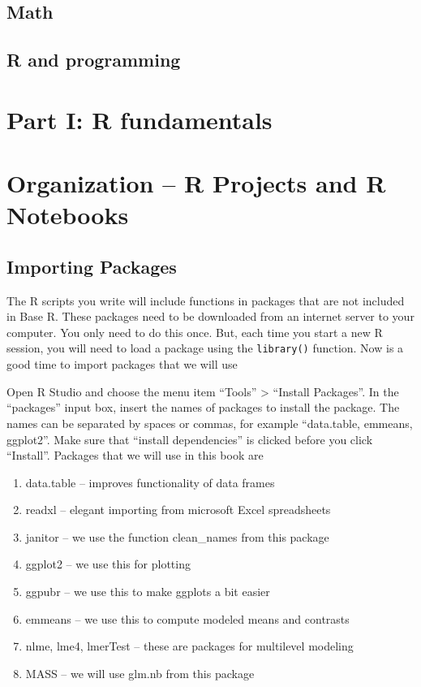 \documentclass[]{book}
\providecommand{\tightlist}{%
  \setlength{\itemsep}{0pt}\setlength{\parskip}{0pt}}
\begin{document}
\section{Math}\label{math}

\section{R and programming}\label{r-and-programming}

\chapter*{Part I: R fundamentals}\label{part-i-r-fundamentals}

\chapter{Organization -- R Projects and R
Notebooks}\label{organization-r-projects-and-r-notebooks}

\section{Importing Packages}\label{importing-packages}

The R scripts you write will include functions in packages that are not
included in Base R. These packages need to be downloaded from an
internet server to your computer. You only need to do this once. But,
each time you start a new R session, you will need to load a package
using the \texttt{library()} function. Now is a good time to import
packages that we will use

Open R Studio and choose the menu item ``Tools'' \textgreater{}
``Install Packages''. In the ``packages'' input box, insert the names of
packages to install the package. The names can be separated by spaces or
commas, for example ``data.table, emmeans, ggplot2''. Make sure that
``install dependencies'' is clicked before you click ``Install''.
Packages that we will use in this book are

\begin{enumerate}
\def\labelenumi{\arabic{enumi}.}
\tightlist
\item
  data.table -- improves functionality of data frames
\item
  readxl -- elegant importing from microsoft Excel spreadsheets
\item
  janitor -- we use the function clean\_names from this package
\item
  ggplot2 -- we use this for plotting
\item
  ggpubr -- we use this to make ggplots a bit easier
\item
  emmeans -- we use this to compute modeled means and contrasts
\item
  nlme, lme4, lmerTest -- these are packages for multilevel modeling
\item
  MASS -- we will use glm.nb from this package
\end{enumerate}
\end{document}
